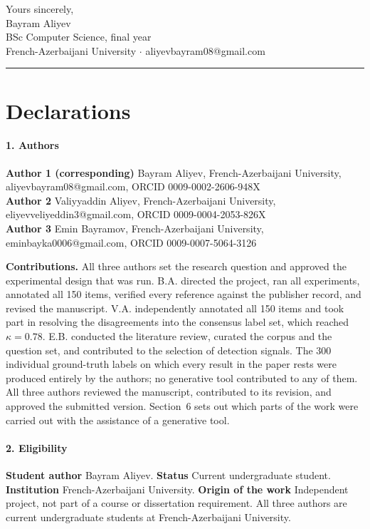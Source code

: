 \documentclass[11pt,a4paper]{article}
\begin{document}
\vspace{1em}
\noindent
Yours sincerely,\\
Bayram Aliyev\\
BSc Computer Science, final year\\
French-Azerbaijani University $\cdot$ aliyevbayram08@gmail.com

\vspace{1.5em}
\hrule
\vspace{1em}

\section*{Declarations}

\paragraph{1. Authors}
\textbf{Author 1 (corresponding)} Bayram Aliyev, French-Azerbaijani University,
aliyevbayram08@gmail.com, ORCID 0009-0002-2606-948X\\
\textbf{Author 2} Valiyyaddin Aliyev, French-Azerbaijani University,
eliyevveliyeddin3@gmail.com, ORCID 0009-0004-2053-826X\\
\textbf{Author 3} Emin Bayramov, French-Azerbaijani University,
eminbayka0006@gmail.com, ORCID 0009-0007-5064-3126

\textbf{Contributions.} All three authors set the research question and approved
the experimental design that was run. B.A. directed the project, ran all
experiments, annotated all 150 items, verified every reference against the
publisher record, and revised the manuscript. V.A. independently annotated all
150 items and took part in resolving the disagreements into the consensus label
set, which reached $\kappa = 0.78$. E.B. conducted the literature review,
curated the corpus and the question set, and contributed to the selection of
detection signals. The 300 individual ground-truth labels on which every result
in the paper rests were produced entirely by the authors; no generative tool
contributed to any of them. All three authors reviewed the manuscript,
contributed to its revision, and approved the submitted version. Section~6 sets
out which parts of the work were carried out with the assistance of a generative
tool.

\paragraph{2. Eligibility}
\textbf{Student author} Bayram Aliyev.
\textbf{Status} Current undergraduate student.
\textbf{Institution} French-Azerbaijani University.
\textbf{Origin of the work} Independent project, not part of a course or
dissertation requirement. All three authors are current undergraduate students
at French-Azerbaijani University.
\end{document}
